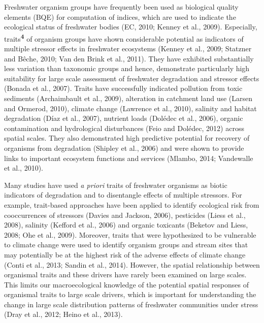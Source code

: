 Freshwater organism groups have frequently been used as biological quality elements (BQE) for computation of indices, which are used to indicate the ecological status of freshwater bodies (EC, 2010; Kenney et al., 2009). Especially, traits\textsuperscript{\textbf{4}} of organism groups have shown considerable potential as indicators of multiple stressor effects in freshwater ecosystems (Kenney et al., 2009; Statzner and Bêche, 2010; Van den Brink et al., 2011). They have exhibited substantially less variation than taxonomic groups and hence, demonstrate particularly high suitability for large scale assessment of freshwater degradation and stressor effects (Bonada et al., 2007). Traits have successfully indicated pollution from toxic sediments (Archaimbault et al., 2009), alteration in catchment land use (Larsen and Ormerod, 2010), climate change (Lawrence et al., 2010), salinity and habitat degradation (Díaz et al., 2007), nutrient loads (Dolédec et al., 2006), organic contamination and hydrological disturbances (Feio and Dolédec, 2012) across spatial scales. They also demonstrated high predictive potential for recovery of organisms from degradation (Shipley et al., 2006) and were shown to provide links to important ecosystem functions and services (Mlambo, 2014; Vandewalle et al., 2010).

Many studies have used \textit{a priori} traits of freshwater organisms as biotic indicators of degradation and to disentangle effects of multiple stressors. For example, trait-based approaches have been applied to identify ecological risk from cooccurrences of stressors (Davies and Jackson, 2006), pesticides (Liess et al., 2008), salinity (Kefford et al., 2006) and organic toxicants (Beketov and Liess, 2008; Ohe et al., 2009). Moreover, traits that were hypothesized to be vulnerable to climate change were used to identify organism groups and stream sites that may potentially be at the highest risk of the adverse effects of climate change (Conti et al., 2013; Sandin et al., 2014). However, the spatial relationship between organismal traits and these drivers have rarely been examined on large scales. This limits our macroecological knowledge of the potential spatial responses of organismal traits to large scale drivers, which is important for understanding the change in large scale distribution patterns of freshwater communities under stress (Dray et al., 2012; Heino et al., 2013).

\bigskip


